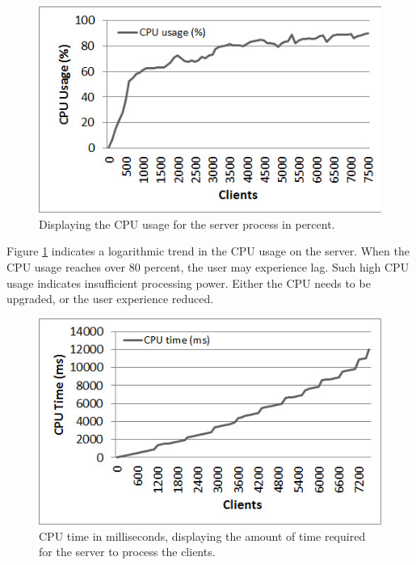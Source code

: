 \documentclass[bsc,frontabs,twoside,singlespacing,parskip,deptreport]{infthesis}     %
\begin{document}
\begin{figure}
\centering
\includegraphics[scale=0.75]{images/test_CLIENT_CPUusage.jpg}
\caption{Displaying the CPU usage for the server process in percent.}
\label{fig:cpu_usage}
\vspace{1em}
\end{figure}

Figure \ref{fig:cpu_usage} indicates a logarithmic trend in the CPU usage on the server. When the CPU usage reaches over 80 percent, the user may experience lag. Such high CPU usage indicates insufficient processing power. Either the CPU needs to be upgraded, or the user experience reduced.

\begin{figure}
\centering
\includegraphics[scale=0.75]{images/test_CLIENT_CPUtime.jpg}
\caption{CPU time in milliseconds, displaying the amount of time required for the server to process the clients.}
\label{fig:cpu_time}
\end{figure}
\end{document}
